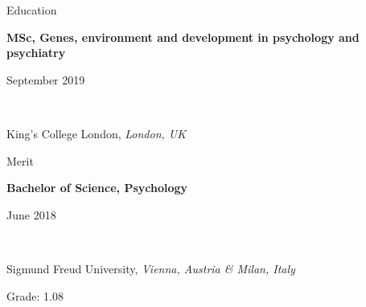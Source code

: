 \documentclass{resume2} %
\newcommand\textbox[1]{%
  \parbox{.48\textwidth}{#1}%
}
\begin{document}
\thispagestyle{plain}



\begin{rSection}{Education}



\textbox{\textbf{MSc, Genes, environment and development in psychology and psychiatry}\hfill}\textbox{\hfill September 2019}\\
\textbox{King's College London, \textit{London, UK}\hfill}{\hfill Merit}

\textbox{\textbf{Bachelor of Science, Psychology}\hfill}\textbox{\hfill June 2018}\\
\textbox{Sigmund Freud University, \textit{Vienna, Austria \& Milan, Italy}}{\hfill Grade: 1.08}


\end{rSection}

\end{document}
